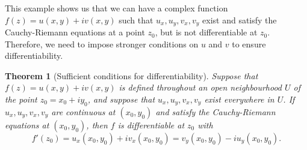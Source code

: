 \documentclass[10pt]{article}
\theoremstyle{newstyle}
\newtheorem{thm}{Theorem}[section]
\begin{document}
This example shows us that we can have a complex function $f(z) = u(x, y) + iv(x, y)$ such that 
$u_x, u_y, v_x, v_y$ exist and satisfy the Cauchy-Riemann equations at a point $z_0$, 
but is not differentiable at $z_0$. Therefore, we need to impose stronger conditions on $u$ and $v$ 
to ensure differentiability. 

\begin{thm}[Sufficient conditions for differentiability]
Suppose that $f(z) = u(x, y) + iv(x, y)$ is defined throughout an open neighbourhood $U$ of the point 
$z_0 = x_0 + iy_0$, and suppose that $u_x, u_y, v_x, v_y$ exist everywhere in $U$. If $u_x, 
u_y, v_x, v_y$ are continuous at $(x_0, y_0)$ and satisfy the Cauchy-Riemann equations at $(x_0, y_0)$, 
then $f$ is differentiable at $z_0$ with 
\[ f'(z_0) = u_x(x_0, y_0) + iv_x(x_0, y_0) = v_y(x_0, y_0) - iu_y(x_0, y_0). \]
\end{thm}
\end{document}
